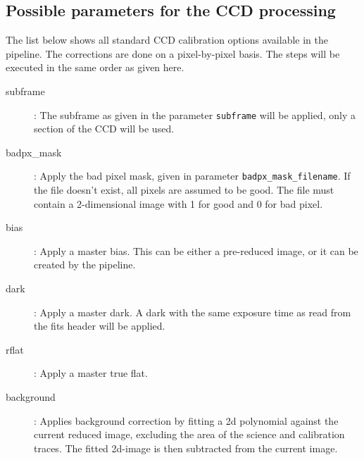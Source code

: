 \documentclass[10pt,a4paper]{article}
\begin{document}
\subsection{Possible parameters for the CCD processing}
\label{Section:parameters_CCD_proc}
\noindent The list below shows all standard CCD calibration options available in the pipeline. The corrections are done on a pixel-by-pixel basis. The steps will be executed in the same order as given here.
\begin{description}
  \item[subframe] : The subframe as given in the parameter \verb|subframe| will be applied, only a section of the CCD will be used.
  \item[badpx\_mask] : Apply the bad pixel mask, given in parameter \verb|badpx_mask_filename|. If the file doesn't exist, all pixels are assumed to be good. The file must contain a 2-dimensional image with 1 for good and 0 for bad pixel.
  \item[bias] : Apply a master bias. This can be either a pre-reduced image, or it can be created by the pipeline. %
  \item[dark] : Apply a master dark. A dark with the same exposure time as read from the fits header will be applied. %
  \item[rflat] : Apply a master true flat. %
  \item[background] : Applies background correction by fitting a 2d polynomial against the current reduced image, excluding the area of the science and calibration traces. The fitted 2d-image is then subtracted from the current image.
\end{description}
\end{document}
